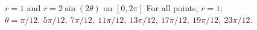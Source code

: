 {$r=1$ and $r=2\sin(2\theta)$ on $[0,2\pi]$}
{For all points, $r=1$; $\theta = \pi/12,\ 5\pi/12,\ 7\pi/12,\ 11\pi/12,\ 13\pi/12,\ 17\pi/12,\ 19\pi/12,\ 23\pi/12$. 
}
